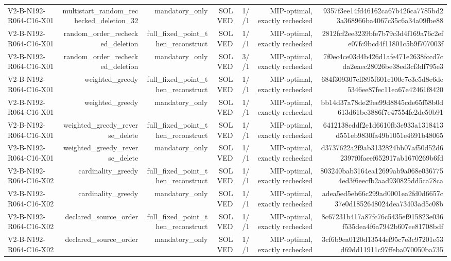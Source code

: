 {\begin{longtable}{lrrrrrr}
V2-B-N192-R064-C16-X01 & multistart\_random\_rechecked\_deletion\_32 & mandatory\_only & SOLVED & 1//1 & MIP-optimal, exactly rechecked & 9357f3ee14fd46162ca67b426ca7785bd23a368966ba4067c35c6a34a09fbe88 \\
V2-B-N192-R064-C16-X01 & random\_order\_rechecked\_deletion & full\_fixed\_point\_then\_reconstruct & SOLVED & 1//1 & MIP-optimal, exactly rechecked & 2812fcf2ee3239bfe7b79c3d4f169a76c2efe07fc9bcd4f11801c5b9f707003f \\
V2-B-N192-R064-C16-X01 & random\_order\_rechecked\_deletion & mandatory\_only & SOLVED & 3//1 & MIP-optimal, exactly rechecked & 7f0ec4ce03d4b426d1afe471e2638fccd7cda2eaec28026be38ed3cf3df795e3 \\
V2-B-N192-R064-C16-X01 & weighted\_greedy & full\_fixed\_point\_then\_reconstruct & SOLVED & 1//1 & MIP-optimal, exactly rechecked & 684f309307eff895f601c100c7e3c5d8e6de5346ee87fec11ea67e42461f8420 \\
V2-B-N192-R064-C16-X01 & weighted\_greedy & mandatory\_only & SOLVED & 1//1 & MIP-optimal, exactly rechecked & bb14d37a78de29ee99d8845cde65f58b0d613d61bc3886f7e47554fe2dc50b91 \\
V2-B-N192-R064-C16-X01 & weighted\_greedy\_reverse\_delete & full\_fixed\_point\_then\_reconstruct & SOLVED & 1//1 & MIP-optimal, exactly rechecked & 6412138cddf2e1d6610fb3c933a1318413d551eb9830fa49b1051e4691b48065 \\
V2-B-N192-R064-C16-X01 & weighted\_greedy\_reverse\_delete & mandatory\_only & SOLVED & 1//1 & MIP-optimal, exactly rechecked & d3737622a2f9ab3132824bb07af50d52d62397f0faeef652917ab1670269b6fd \\
V2-B-N192-R064-C16-X02 & cardinality\_greedy & full\_fixed\_point\_then\_reconstruct & SOLVED & 1//1 & MIP-optimal, exactly rechecked & 803240bab3164ea12699ab9a068e0367754ed3f6eecfb2aad930825dd5ca78ca \\
V2-B-N192-R064-C16-X02 & cardinality\_greedy & mandatory\_only & SOLVED & 1//1 & MIP-optimal, exactly rechecked & adea5ed5eb66c299ad0001ea2fd0d6657c37e0d1852648024dea73403ad5c08b \\
V2-B-N192-R064-C16-X02 & declared\_source\_order & full\_fixed\_point\_then\_reconstruct & SOLVED & 1//1 & MIP-optimal, exactly rechecked & 8c67231b417a87fc76c5435ef915823e036f535dea4f6a7942b607ee81708bdf \\
V2-B-N192-R064-C16-X02 & declared\_source\_order & mandatory\_only & SOLVED & 1//1 & MIP-optimal, exactly rechecked & 3cf6b9ea0120d13544ef95c7e3c97201e53d69dd11911c97ffeba070050ba735 \\

\end{longtable}}

